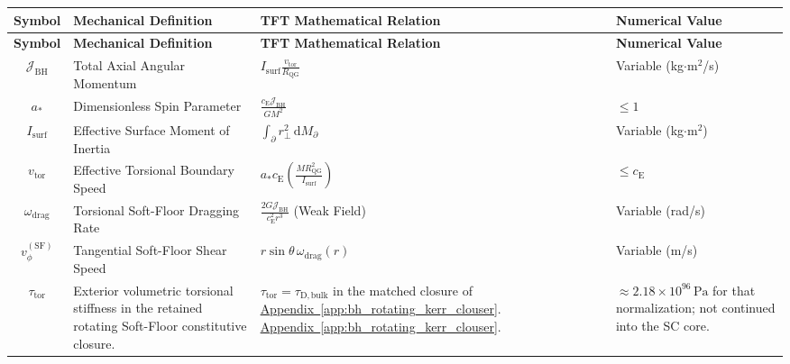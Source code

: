 \vspace{0.5cm}
\noindent
\renewcommand{\arraystretch}{1.6}
\begin{longtable}{@{} c p{5.5cm} p{4cm} p{3.5cm} @{}}
\toprule
\textbf{Symbol} & \textbf{Mechanical Definition} & \textbf{TFT Mathematical Relation} & \textbf{Numerical Value} \\
\midrule
\endfirsthead

\toprule
\textbf{Symbol} & \textbf{Mechanical Definition} & \textbf{TFT Mathematical Relation} & \textbf{Numerical Value} \\
\midrule
\endhead

$\mathcal{J}_{\mathrm{BH}}$ & Total Axial Angular Momentum & $I_{\mathrm{surf}} \frac{v_{\mathrm{tor}}}{R_{\mathrm{QG}}}$ & Variable (kg$\cdot$m$^2$/s) \\

$a_\ast$ & Dimensionless Spin Parameter & $\frac{c_{\mathrm{E}}\mathcal{J}_{\mathrm{BH}}}{GM^2}$ & $\le 1$ \\

$I_{\mathrm{surf}}$ & Effective Surface Moment of Inertia & $\int_{\partial} r_\perp^2 \, \mathrm{d}M_{\partial}$ & Variable (kg$\cdot$m$^2$) \\

$v_{\mathrm{tor}}$ & Effective Torsional Boundary Speed & $a_\ast c_{\mathrm{E}} \left(\frac{M R_{\mathrm{QG}}^2}{I_{\mathrm{surf}}}\right)$ & $\le c_{\mathrm{E}}$ \\

$\omega_{\mathrm{drag}}$ & Torsional Soft-Floor Dragging Rate & $\frac{2G\mathcal{J}_{\mathrm{BH}}}{c_{\mathrm{E}}^2r^3}$ (Weak Field) & Variable (rad/s) \\

$v_{\phi}^{(\mathrm{SF})}$ & Tangential Soft-Floor Shear Speed & $r\sin\theta \, \omega_{\mathrm{drag}}(r)$ & Variable (m/s) \\

$\tau_{\mathrm{tor}}$ & {\raggedright Exterior volumetric torsional stiffness in the retained rotating Soft-Floor constitutive closure.\par} & {\raggedright $\tau_{\mathrm{tor}}=\tau_{\mathrm{D,bulk}}$ in the matched closure of \hyperref[app:bh_rotating_kerr_clouser]{Appendix~\ref*{app:bh_rotating_kerr_clouser}}. \newline \hyperref[app:bh_rotating_kerr_clouser]{Appendix~\ref*{app:bh_rotating_kerr_clouser}}.\par} & {\raggedright $\approx2.18\times10^{96}\,\mathrm{Pa}$ for that normalization; not continued into the SC core.\par} \\


\end{longtable}
